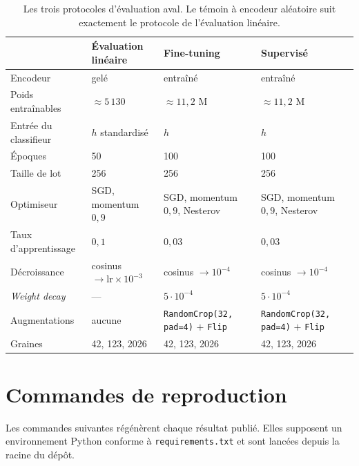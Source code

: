 \documentclass[11pt,a4paper]{article}
\begin{document}
\begin{table}[htbp]
\centering\small
\caption{Les trois protocoles d'évaluation aval. Le témoin à encodeur aléatoire suit
exactement le protocole de l'évaluation linéaire.}
\begin{tabularx}{\textwidth}{@{}lXXX@{}}
\toprule
& \textbf{Évaluation linéaire} & \textbf{Fine-tuning} & \textbf{Supervisé} \\
\midrule
Encodeur & gelé & entraîné & entraîné \\
Poids entraînables & $\approx 5\,130$ & $\approx 11{,}2$ M & $\approx 11{,}2$ M \\
Entrée du classifieur & $h$ standardisé & $h$ & $h$ \\
Époques & 50 & 100 & 100 \\
Taille de lot & 256 & 256 & 256 \\
Optimiseur & SGD, momentum $0{,}9$ & SGD, momentum $0{,}9$, Nesterov & SGD, momentum $0{,}9$, Nesterov \\
Taux d'apprentissage & $0{,}1$ & $0{,}03$ & $0{,}03$ \\
Décroissance & cosinus $\rightarrow \text{lr} \times 10^{-3}$ & cosinus $\rightarrow 10^{-4}$ & cosinus $\rightarrow 10^{-4}$ \\
\emph{Weight decay} & --- & $5 \cdot 10^{-4}$ & $5 \cdot 10^{-4}$ \\
Augmentations & aucune & \texttt{RandomCrop(32, pad=4)} $+$ \texttt{Flip} & \texttt{RandomCrop(32, pad=4)} $+$ \texttt{Flip} \\
Graines & 42, 123, 2026 & 42, 123, 2026 & 42, 123, 2026 \\
\bottomrule
\end{tabularx}
\end{table}

\section{Commandes de reproduction}
\label{ann:commandes}

Les commandes suivantes régénèrent chaque résultat publié. Elles supposent un environnement
Python conforme à \texttt{requirements.txt} et sont lancées depuis la racine du dépôt.
\end{document}

